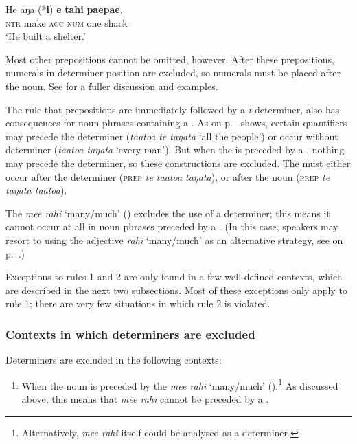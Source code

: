\ea\label{ex:5.16}
\gll He aŋa (*\textbf{i}) \textbf{e} \textbf{tahi} \textbf{paepae}. \\
\textsc{ntr} make \textsc{acc} \textsc{num} one shack \\

\glt
‘He built a shelter.’ \textstyleExampleref{[Blx-2-1.015]}
\z

Most other prepositions cannot be omitted, however. After these prepositions, numerals in determiner position are excluded, so numerals must be placed after the noun. See  for a fuller discussion and examples.

The rule that prepositions are immediately followed by a \textit{t}{}-determiner, also has consequences for noun phrases containing a . As  on p.~\pageref{tab:30} shows, certain quantifiers may precede the determiner (\textit{ta{\ꞌ}ato{\ꞌ}a} \textit{te taŋata} ‘all the people’) or occur without determiner (\textit{ta{\ꞌ}ato{\ꞌ}a taŋata} ‘every man’). But when the  is preceded by a , nothing may precede the determiner, so these constructions are excluded. The  must either occur after the determiner (\textsc{prep} \textit{te ta}\textit{{\ꞌ}ato{\ꞌ}a taŋata}), or after the noun (\textsc{prep} \textit{te taŋata ta{\ꞌ}ato{\ꞌ}a}). 

The  \textit{me{\ꞌ}e rahi} ‘many/much’ () excludes the use of a determiner; this means it cannot occur at all in noun phrases preceded by a . (In this case, speakers may resort to using the adjective \textit{rahi} ‘many/much’ as an alternative strategy, see  on p.~\pageref{ex:4.102}.)

Exceptions to rules 1 and 2 are only found in a few well-defined contexts, which are described in the next two subsections. Most of these exceptions only apply to rule 1; there are very few situations in which rule 2 is violated.

\subsubsection{Contexts in which determiners are excluded}\label{sec:5.3.2.2}

Determiners are excluded in the following contexts:

\begin{enumerate}
\setcounter{enumi}{0}
\item
When the noun is preceded by the  \textit{me{\ꞌ}e rahi} ‘many/much’ ().\footnote{\label{fn:247}Alternatively, \textit{me}\textit{{\ꞌ}e rahi} itself could be analysed as a determiner.}  As discussed above, this means that \textit{me{\ꞌ}e rahi} cannot be preceded by a .
\end{enumerate}

